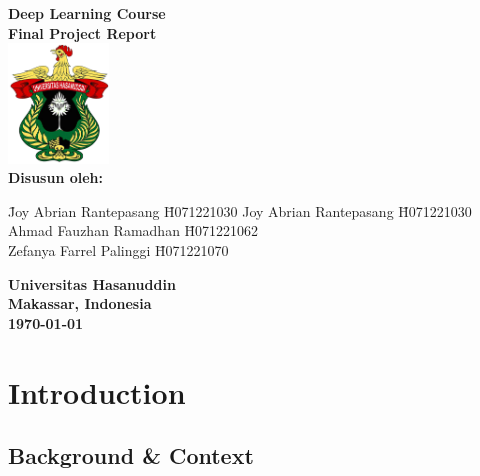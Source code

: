\documentclass[12pt,a4paper]{article}
\begin{document}
\begin{titlepage}
    \centering
    \vspace*{1cm}

    {\LARGE \textbf{Deep Learning Course}}\\[0.5cm]
    {\Large \textbf{Final Project Report}}\\[2cm]

    \includegraphics[width=0.2\textwidth]{unhass.png} \\[1cm]  %

    \textbf{Disusun oleh:}\\[0.5cm]
    \begin{tabbing}
        \hspace{4cm} \= Joy Abrian Rantepasang \hspace{1.5cm} \= H071221030 \kill
        \> Joy Abrian Rantepasang \hspace{1cm} \= H071221030 \\
        \> Ahmad Fauzhan Ramadhan \hspace{0.4cm} \= H071221062 \\
        \> Zefanya Farrel Palinggi \hspace{1.25cm} \= H071221070 \\
    \end{tabbing}
    
    \vfill
    
    \textbf{Universitas Hasanuddin}\\
    \textbf{Makassar, Indonesia}\\[0.5cm]
    \textbf{\today}
    
\end{titlepage}


\tableofcontents
\newpage

\section{Introduction}
\subsection{Background \& Context}
\end{document}
